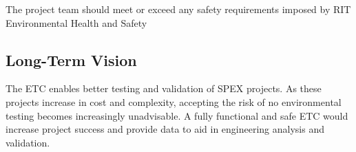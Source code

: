 \documentclass[conference]{IEEEtran} %
\begin{document}
  The project team should meet or exceed any safety requirements imposed by RIT Environmental Health and Safety

\subsection{Long-Term Vision}
\label{sec:vision}
The ETC enables better testing and validation of SPEX projects. As these projects increase in cost and complexity, accepting the risk of no environmental testing becomes increasingly unadvisable. A fully functional and safe ETC would increase project success and provide data to aid in engineering analysis and validation.


%
%
%
\end{document}
